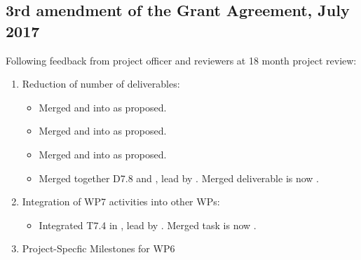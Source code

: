 \clearpage
\thispagestyle{empty}
\subsection*{3rd amendment of the Grant Agreement, July 2017}
Following feedback from project officer and reviewers at 18 month project review:
\begin{enumerate}
\item Reduction of number of deliverables:
  \begin{itemize}
  \item Merged  and  into
     as proposed.
  \item Merged  and  into
     as proposed.
  \item Merged  and  into
     as proposed.
  \item Merged together D7.8 and
    , lead by
    . Merged deliverable is now
    .
  \end{itemize}
\item Integration of WP7 activities into other WPs:
  \begin{itemize}
  \item Integrated T7.4 in
    , lead by
    . Merged task is now
    .
  \end{itemize}
\item Project-Specfic Milestones for WP6
\end{enumerate}


\clearpage
\setcounter{page}{1}

